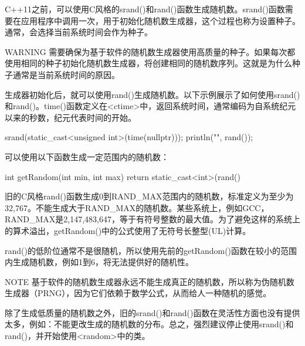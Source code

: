 C++11之前，可以使用C风格的srand()和rand()函数生成随机数。srand()函数需要在应用程序中调用一次，用于初始化随机数生成器，这个过程也称为设置种子。通常，会选择当前系统时间会作为种子。

\begin{myWarning}{WARNING}
需要确保为基于软件的随机数生成器使用高质量的种子。如果每次都使用相同的种子初始化随机数生成器，将创建相同的随机数序列。这就是为什么种子通常是当前系统时间的原因。
\end{myWarning}

生成器初始化后，就可以使用rand()生成随机数。以下示例展示了如何使用srand()和rand()。time()函数定义在<ctime>中，返回系统时间，通常编码为自系统纪元以来的秒数，纪元代表时间的开始。

\begin{cpp}
srand(static_cast<unsigned int>(time(nullptr)));
println("{}", rand());
\end{cpp}

可以使用以下函数生成一定范围内的随机数：

\begin{cpp}
int getRandom(int min, int max)
{
    return static_cast<int>(rand() %
}
\end{cpp}

旧的C风格rand()函数生成0到RAND\_MAX范围内的随机数，标准定义为至少为32,767。不能生成大于RAND\_MAX的随机数。某些系统上，例如GCC，RAND\_MAX是2,147,483,647，等于有符号整数的最大值。为了避免这样的系统上的算术溢出，getRandom()中的公式使用了无符号长整型(UL)计算。

rand()的低阶位通常不是很随机，所以使用先前的getRandom()函数在较小的范围内生成随机数，例如1到6，将无法提供好的随机性。

\begin{myNotic}{NOTE}
基于软件的随机数生成器永远不能生成真正的随机数，所以称为伪随机数生成器（PRNG），因为它们依赖于数学公式，从而给人一种随机的感觉。
\end{myNotic}

除了生成低质量的随机数之外，旧的srand()和rand()函数在灵活性方面也没有提供太多，例如：不能更改生成的随机数的分布。总之，强烈建议停止使用srand()和rand()，并开始使用<random>中的类。















